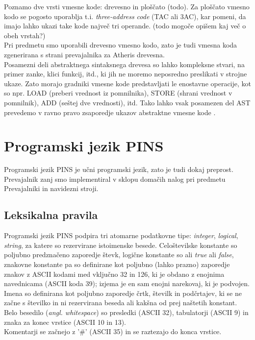 \documentclass[a4paper, 12p]{book}
\begin{document}
Poznamo dve vrsti vmesne kode: drevesno in ploščato (todo). Za ploščato vmesno kodo se pogosto uporablja t.i. \textit{three-address code} (TAC ali 3AC), kar pomeni, da imajo lahko ukazi take kode največ tri operande. (todo mogoče opišem kaj več o obeh vrstah?)\\
\indent Pri predmetu smo uporabili drevesno vmesno kodo, zato je tudi vmesna koda zgenerirana s strani prevajalnika za Atheris drevesna.\\
\indent Posamezni deli abstraktnega sintaksnega drevesa so lahko kompleksne stvari, na primer zanke, klici funkcij, itd., ki jih ne moremo neposredno preslikati v strojne ukaze. Zato morajo gradniki vmesne kode predstavljati le enostavne operacije, kot so npr. LOAD (preberi vrednost iz pomnilnika), STORE (shrani vrednost v pomnilnik), ADD (seštej dve vrednosti), itd. Tako lahko vsak posamezen del AST prevedemo v ravno pravo zsaporedje ukazov abstraktne vmesne kode \cite{modernCompiler}. \\ 

\chapter{Programski jezik PINS}

Programski jezik PINS je učni programski jezik, zato je tudi dokaj preprost. Prevajalnik zanj smo implementiral v sklopu domačih nalog pri predmetu Prevajalniki in navidezni stroji.

\section{Leksikalna pravila}

Programski jezik PINS podpira tri atomarne podatkovne tipe: \textit{integer}, \textit{logical}, \textit{string}, za katere so rezervirane istoimenske besede. Celoštevilske konstante so poljubno predznačeno zaporedje števk, logične konstante so ali \textit{true} ali \textit{false}, znakovne konstante pa so definirane kot poljubno (lahko prazno) zaporedje znakov z ASCII kodami med vključno 32 in 126, ki je obdano z enojnima navednicama (ASCII koda 39); izjema je en sam enojni narekovaj, ki je podvojen. \\
\indent Imena so definirana kot poljubno zaporedje črtk, številk in podčrtajev, ki se ne začne s številko in ni rezervirana beseda ali kakšna od prej naštetih konstant. \\
\indent Belo besedilo (\textit{angl. whitespace}) so presledki (ASCII 32), tabulatorji (ASCII 9) in znaka za konec vrstice (ASCII 10 in 13). \\
\indent Komentarji se začnejo z '\#' (ASCII 35) in se raztezajo do konca vrstice.
\end{document}
